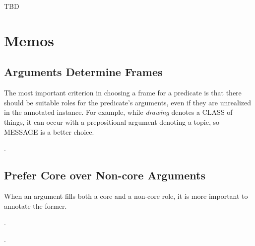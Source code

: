 \documentclass[a4paper]{article}
\newcommand{\fr}[1]{\textsf{#1}}
\newcommand{\rl}[1]{\textsf{#1}}
\begin{document}
TBD

\section{Memos}

\subsection{Arguments Determine Frames}

The most important criterion in choosing a frame for a predicate is that there
should be suitable roles for the predicate's arguments, even if they are
unrealized in the annotated instance. For example, while \emph{drawing} denotes
a \fr{CLASS} of things, it can occur with a prepositional argument denoting a
\rl{topic}, so \fr{MESSAGE} is a better choice.

\ex.

\subsection{Prefer Core over Non-core Arguments}

When an argument fills both a core and a non-core role, it is more important to
annotate the former.

\ex.

\ex.



\end{document}
